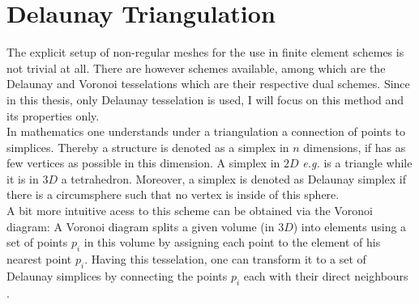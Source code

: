 \section{Delaunay Triangulation}
\label{app:delaunay}
The explicit setup of non-regular meshes for the use in finite element schemes is not trivial at all.
There are however schemes available, among which are the Delaunay and Voronoi tesselations which are their respective dual schemes.
Since in this thesis, only Delaunay tesselation is used, I will focus on this method and its properties only.\\
In mathematics one understands under a triangulation a connection of points to simplices.
Thereby a structure is denoted as a simplex in $n$ dimensions, if has as few vertices as possible in this dimension.
A simplex in $2D$ \textit{e.g.} is a triangle while it is in $3D$ a tetrahedron.
Moreover, a simplex is denoted as Delaunay simplex if there is a circumsphere such that no vertex is inside of this sphere.\\
A bit more intuitive acess to this scheme can be obtained via the Voronoi diagram: A Voronoi diagram splits a given volume (in $3D$) into elements using a set of points $p_i$ in this volume by assigning each point to the element of his nearest point $p_i$.
Having this tesselation, one can transform it to a set of Delaunay simplices by connecting the points $p_i$ each with their direct neighbours \cite{tetgen}.
